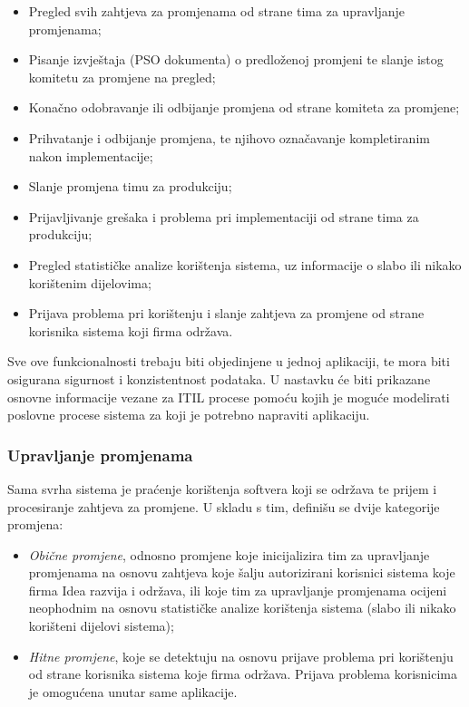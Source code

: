 \documentclass[12pt,a4paper]{article}
\begin{document}
\begin{itemize}
\renewcommand\labelitemi{$\square$}
\item Pregled svih zahtjeva za promjenama od strane tima za upravljanje promjenama;
\item Pisanje izvještaja (PSO dokumenta) o predloženoj promjeni te slanje istog komitetu za promjene na pregled;
\item Konačno odobravanje ili odbijanje promjena od strane komiteta za promjene;
\item Prihvatanje i odbijanje promjena, te njihovo označavanje kompletiranim nakon implementacije;
\item Slanje promjena timu za produkciju;
\item Prijavljivanje grešaka i problema pri implementaciji od strane tima za produkciju;
\item Pregled statističke analize korištenja sistema, uz informacije o slabo ili nikako korištenim dijelovima;
\item Prijava problema pri korištenju i slanje zahtjeva za promjene od strane korisnika sistema koji firma održava.
\end{itemize}

Sve ove funkcionalnosti trebaju biti objedinjene u jednoj aplikaciji, te mora biti osigurana sigurnost i konzistentnost podataka. U nastavku će biti prikazane osnovne informacije vezane za ITIL procese pomoću kojih je moguće modelirati poslovne procese sistema za koji je potrebno napraviti aplikaciju.

\subsubsection{Upravljanje promjenama}

\quad Sama svrha sistema je praćenje korištenja softvera koji se održava te prijem i procesiranje zahtjeva za promjene. U skladu s tim, definišu se dvije kategorije promjena:

\begin{itemize}
\renewcommand\labelitemi{-}
\item \textit{Obične promjene}, odnosno promjene koje inicijalizira tim za upravljanje promjenama na osnovu zahtjeva koje šalju autorizirani korisnici sistema koje firma Idea razvija i održava, ili koje tim za upravljanje promjenama ocijeni neophodnim na osnovu statističke analize korištenja sistema (slabo ili nikako korišteni dijelovi sistema);
\item \textit{Hitne promjene}, koje se detektuju na osnovu prijave problema pri korištenju od strane korisnika sistema koje firma održava. Prijava problema korisnicima je omogućena unutar same aplikacije.
\end{itemize}
\end{document}
